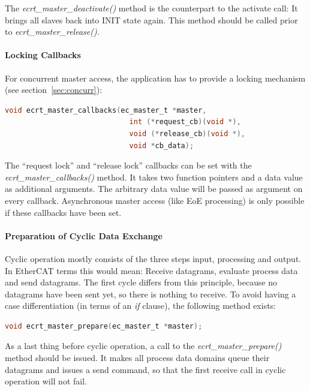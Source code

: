 \documentclass[a4paper,12pt,BCOR6mm,bibtotoc,idxtotoc]{scrbook}
\begin{document}
The \textit{ecrt\_master\_deactivate()} method is the counterpart to
the activate call: It brings all slaves back into INIT state again.
This method should be called prior to
\textit{ecrt\_\-master\_\-release()}.

\paragraph{Locking Callbacks}

For concurrent master access, the application has to provide a locking
mechanism (see section~\ref{sec:concurr}):

\begin{lstlisting}[gobble=2,language=C]
  void ecrt_master_callbacks(ec_master_t *master,
                             int (*request_cb)(void *),
                             void (*release_cb)(void *),
                             void *cb_data);
\end{lstlisting}

The ``request lock'' and ``release lock'' callbacks can be set with
the \textit{ecrt\_master\_call\-backs()} method. It takes two function
pointers and a data value as additional arguments. The arbitrary data
value will be passed as argument on every callback. Asynchronous
master access (like EoE processing) is only possible if these
callbacks have been set.

\paragraph{Preparation of Cyclic Data Exchange}

Cyclic operation mostly consists of the three steps input, processing and
output. In EtherCAT terms this would mean: Receive datagrams, evaluate process
data and send datagrams. The first cycle differs from this principle, because
no datagrams have been sent yet, so there is nothing to receive. To avoid
having a case differentiation (in terms of an \textit{if} clause), the
following method exists:

\begin{lstlisting}[gobble=2,language=C]
  void ecrt_master_prepare(ec_master_t *master);
\end{lstlisting}

As a last thing before cyclic operation, a call to the
\textit{ecrt\_master\_prepare()} method should be issued. It makes all
process data domains queue their datagrams and issues a send command,
so that the first receive call in cyclic operation will not fail.
\end{document}
